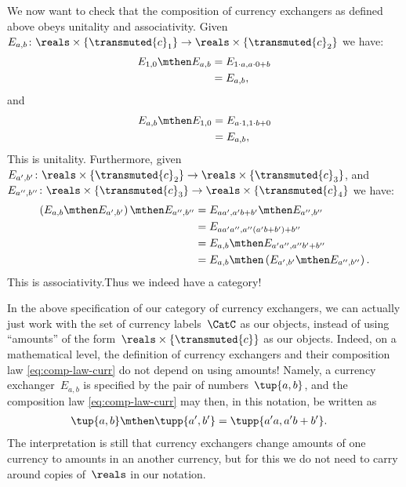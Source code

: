 We now want to check that the composition of currency exchangers as defined above obeys unitality and associativity. Given~$E_{a,b}\colon \reals \times \{\transmuted{c}_1\}\to \reals \times \{\transmuted{c}_2\}$ we have:
\begin{equation*}
    \begin{aligned}
      E_{1,0}\mthen E_{a,b}&=E_{1\cdot a, a\cdot 0+b}\\
      &=E_{a,b},
    \end{aligned}
\end{equation*}
and
\begin{equation*}
    \begin{aligned}
      E_{a,b}\mthen E_{1,0}&=E_{a\cdot 1, 1\cdot b+0}\\
      &=E_{a,b},
    \end{aligned}
\end{equation*}
This is unitality. Furthermore, given~$E_{a',b'}\colon \reals \times \{\transmuted{c}_2\}\to \reals\times \{\transmuted{c}_3\}$, and~$E_{a'',b''}\colon \reals \times \{\transmuted{c}_3\}\to \reals \times \{\transmuted{c}_4\}$ we have:
\begin{equation*}
    \begin{aligned}
     \left( E_{a,b}\mthen E_{a',b'}\right)\mthen E_{a'',b''}&=E_{aa',a'b+b'}\mthen E_{a'',b''}\\
     &=E_{aa'a'',a''(a'b+b')+b''}\\
     &=E_{a,b}\mthen E_{a'a'',a''b'+b''}\\
     &=E_{a,b}\mthen \left( E_{a',b'}\mthen E_{a'',b''}\right).
    \end{aligned}
\end{equation*}
This is associativity.Thus we indeed have a category!

\begin{remark}
  In the above specification of our category of currency exchangers, we can actually just work with the set of currency labels~$\CatC$ as our objects, instead of using ``amounts'' of the form~$\reals \times \{\transmuted{c}\}$ as our objects. Indeed, on a mathematical level, the definition of currency exchangers and their composition law \cref{eq:comp-law-curr} do not depend on using amounts! Namely, a currency exchanger~$E_{a,b}$ is specified by the pair of numbers~$\tup{a, b}$, and the composition law \cref{eq:comp-law-curr} may then, in this notation, be written as
  \begin{equation}
    \begin{aligned}
      \label{eq:currencycomp}
      \tup{a,b}\mthen \tupp{a',b'}&=\tupp{a' a, a' b + b'}.
    \end{aligned}
  \end{equation}
  The interpretation is still that currency exchangers change amounts of one currency to amounts in an another currency, but for this we do not need to carry around copies of~$\reals$ in our notation.
\end{remark}

